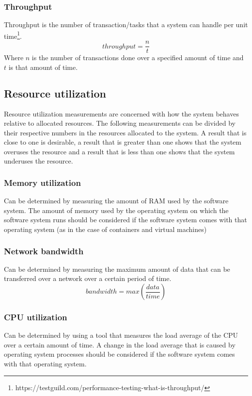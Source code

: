 \documentclass[11pt,a4paper]{article}
\begin{document}
\subsubsection{Throughput}
Throughput is the number of transaction/tasks that a system can handle per unit
time\footnote{https://testguild.com/performance-testing-what-is-throughput/}.
\[throughput = \frac{n}{t}\]
Where $n$ is the number of transactions done over a specified amount of time and $t$ is that amount of time.

\subsection{Resource utilization}
Resource utilization measurements are concerned with how the system behaves relative to allocated resources.
The following measurements can be divided by their respective numbers in the resources allocated to the system.
A result that is close to one is desirable,
a result that is greater than one shows that the system overuses the resource
and a result that is less than one shows that the system underuses the resource.

\subsubsection{Memory utilization}
Can be determined by measuring the amount of RAM used by the software system. The amount of memory used by the operating
system on which the software system runs should be considered if the software system comes with that operating system
(as in the case of containers and virtual machines)

\subsubsection{Network bandwidth}
Can be determined by measuring the maximum amount of data that can be transferred over a network over a certain
period of time.
\[bandwidth = max(\frac{data}{time})\]

\subsubsection{CPU utilization}
Can be determined by using a tool that measures the load average of the CPU over a certain amount of time. A change in the
load average that is caused by operating system processes should be considered if the software system comes
with that operating system.
\end{document}
